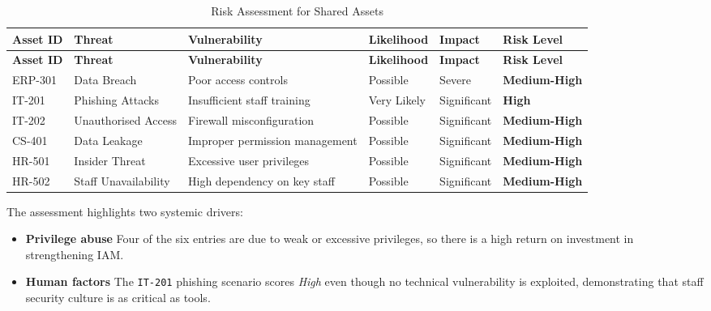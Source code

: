 \begin{longtable}{|p{2cm}|p{2.5cm}|p{3cm}|p{2cm}|p{2cm}|p{2cm}|}
  \caption{Risk Assessment for Shared Assets}
  \label{tab:shared_assets_risks}                                                                                                          \\
  \hline
  \textbf{Asset ID} & \textbf{Threat}      & \textbf{Vulnerability}         & \textbf{Likelihood} & \textbf{Impact} & \textbf{Risk Level}  \\
  \hline
  \endfirsthead

  \hline
  \textbf{Asset ID} & \textbf{Threat}      & \textbf{Vulnerability}         & \textbf{Likelihood} & \textbf{Impact} & \textbf{Risk Level}  \\
  \hline
  \endhead

  \hline
  \endfoot

  ERP-301           & Data Breach          & Poor access controls           & Possible            & Severe          & \textbf{Medium-High} \\
  \hline
  IT-201            & Phishing Attacks     & Insufficient staff training    & Very Likely         & Significant     & \textbf{High}        \\
  \hline
  IT-202            & Unauthorised Access  & Firewall misconfiguration      & Possible            & Significant     & \textbf{Medium-High} \\
  \hline
  CS-401            & Data Leakage         & Improper permission management & Possible            & Significant     & \textbf{Medium-High} \\
  \hline
  HR-501            & Insider Threat       & Excessive user privileges      & Possible            & Significant     & \textbf{Medium-High} \\
  \hline
  HR-502            & Staff Unavailability & High dependency on key staff   & Possible            & Significant     & \textbf{Medium-High} \\
  \hline
\end{longtable}

The assessment highlights two systemic drivers:

\begin{itemize}
  \item \textbf{Privilege abuse} Four of the six entries are due to weak or excessive privileges, so there is a high return on investment in strengthening \ac{IAM}.
  \item \textbf{Human factors} The \texttt{IT-201} phishing scenario scores \emph{High} even though no technical vulnerability is exploited, demonstrating that staff security culture is as critical as tools.
\end{itemize}

